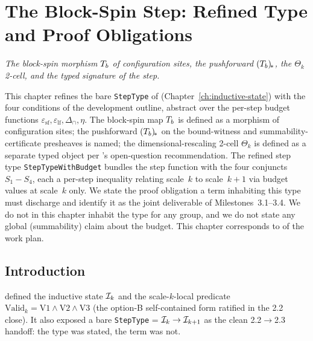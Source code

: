 %

\chapter{The Block-Spin Step:
  Refined Type and Proof Obligations}
\label{ch:block-spin-morphism}

\noindent\emph{The block-spin morphism $T_b$ of configuration sites,
the pushforward $(T_b)_{\!*}$, the $\Theta_k$ 2-cell, and the typed
signature of the step.}

This chapter refines the bare \texttt{StepType} of 
(Chapter~\ref{ch:inductive-state}) with the four conditions of
the development outline, abstract over the per-step budget
functions $\varepsilon_{\mathrm{sf}}, \varepsilon_{\mathrm{lf}},
\Delta_{\cap}, \eta$.  The block-spin map $T_b$ is defined as a
morphism of configuration sites; the pushforward $(T_b)_{\!*}$ on the
bound-witness and summability-certificate presheaves is named; the
dimensional-rescaling 2-cell $\Theta_k$ is defined as a separate
typed object per 's open-question recommendation.  The
refined step type \texttt{StepTypeWithBudget} bundles the step
function with the four conjuncts $S_1\!-\!S_4$, each a per-step
inequality relating scale~$k$ to scale~$k+1$ via budget values at
scale~$k$ only.  We state the proof obligation a term inhabiting this
type must discharge and identify it as the joint deliverable of
Milestones~3.1--3.4.  We do not in this chapter inhabit the type for
any group, and we do not state any global (summability) claim about
the budget.  This chapter corresponds to  of
the work plan.

\section{Introduction}
\label{sec:block-spin-intro}

 defined the inductive state $\mathcal{I}_k$ and the scale-$k$-local predicate $\mathrm{Valid}_k = \mathrm{V1} \wedge \mathrm{V2} \wedge \mathrm{V3}$ (the option-B self-contained form ratified in the 2.2 close).  It also exposed a bare \texttt{StepType} = $\mathcal{I}_k \to \mathcal{I}_{k+1}$ as the clean 2.2$\to$2.3 handoff: the type was stated, the term was not.


